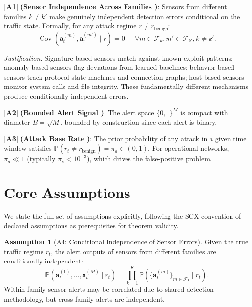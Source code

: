 \documentclass[11pt,a4paper]{article}
\theoremstyle{definition}
\newtheorem{assumption}[theorem]{Assumption}
\theoremstyle{remark}
\newcommand{\assumptionTag}[1]{\textsf{\textbf{[A#1]}}}
\newcommand{\SCX}{\textsc{SCX}}
\DeclareMathOperator{\Cov}{Cov}
\newcommand{\Pbb}{\mathbb{P}}
\newcommand{\cF}{\mathcal{F}}
\newcommand{\alertvec}{\mathbf{a}}
\begin{document}
\assumptionTag{1} \textbf{(Sensor Independence Across Families )}: Sensors from different families $k \neq k'$ make genuinely independent detection errors conditional on the traffic state. Formally, for any attack regime $r \neq r_{\mathrm{benign}}$:
\begin{equation}
\Cov(\alertvec_t^{(m)}, \alertvec_t^{(m')} \mid r) = 0, \quad \forall m \in \cF_k, m' \in \cF_{k'}, k \neq k'.
\label{eq:sensor_independence}
\end{equation}

\textit{Justification:} Signature-based sensors match against known exploit patterns; anomaly-based sensors flag deviations from learned baselines; behavior-based sensors track protocol state machines and connection graphs; host-based sensors monitor system calls and file integrity. These fundamentally different mechanisms produce conditionally independent errors.

\assumptionTag{2} \textbf{(Bounded Alert Signal )}: The alert space $\{0, 1\}^{M}$ is compact with diameter $B = \sqrt{M}$, bounded by construction since each alert is binary.

\assumptionTag{3} \textbf{(Attack Base Rate )}: The prior probability of any attack in a given time window satisfies $\Pbb(r_t \neq r_{\mathrm{benign}}) = \pi_a \in (0, 1)$. For operational networks, $\pi_a \ll 1$ (typically $\pi_a < 10^{-3}$), which drives the false-positive problem.

\section{Core Assumptions }
\label{sec:assumptions}

We state the full set of assumptions explicitly, following the \SCX{} convention of declared assumptions as prerequisites for theorem validity.

\begin{assumption}[A4: Conditional Independence of Sensor Errors]
\label{ass:A4}
Given the true traffic regime $r_t$, the alert outputs of sensors from different families are conditionally independent:
\begin{equation}
\Pbb(\alertvec_t^{(1)}, \ldots, \alertvec_t^{(M)} \mid r_t) = \prod_{k=1}^{K} \Pbb(\{\alertvec_t^{(m)}\}_{m \in \cF_k} \mid r_t).
\label{eq:cond_indep}
\end{equation}
Within-family sensor alerts may be correlated due to shared detection methodology, but cross-family alerts are independent.
\end{assumption}
\end{document}
